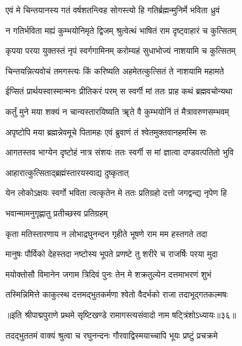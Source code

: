 \twolineshloka
{एवं मे चिन्तयानस्य गतं वर्षशतन्त्विह}
{सोगस्त्यो हि गतिर्ब्रह्मन्मुनिर्मे भविता ध्रुवं}%

\twolineshloka
{न गतिर्भविता मह्यं कुम्भयोनिमृते द्विजम्}
{श्रुत्वेत्थं भाषितं राम दृष्ट्वाहारं च कुत्सितम्}%

\twolineshloka
{कृपया परया युक्तस्तं नृपं स्वर्गगामिनम्}
{करोम्यहं सुधाभोज्यं नाशयामि च कुत्सितम्}%

\twolineshloka
{चिन्तयन्नित्यवोचं तमगस्त्यः किं करिष्यति}
{अहमेतत्कुत्सितं ते नाशयामि महामते}%

\twolineshloka
{ईप्सितं प्रार्थयस्वास्मान्मनः प्रीतिकरं परम्}
{स स्वर्गी मां ततः प्राह कथं ब्रह्मवचोन्यथा}%

\twolineshloka
{कर्तुं मुने मया शक्यं न चान्यस्तारयिष्यति}
{ॠते वै कुम्भयोनिं तं मैत्रावरुणसम्भवम्}%

\twolineshloka
{अपृष्टोपि मया ब्रह्मन्नेवमूचे पितामहः}
{एवं ब्रुवाणं तं श्वेतमुक्तवानहमस्मि सः}%

\twolineshloka
{आगतस्तव भाग्येन दृष्टोहं नात्र संशयः}
{ततः स्वर्गी स मां ज्ञात्वा दण्डवत्पतितो भुवि}%



\onelineshloka
{आहारात्कुत्सिताद्ब्रह्मंस्तारयस्वाद्य दुष्कृतात्}%

\twolineshloka
{येन लोकोऽक्षयः स्वर्गो भविता त्वत्कृतेन मे}
{ततः प्रतिग्रहो दत्तो जगद्वन्द्य नृपेण हि}%


\onelineshloka
{भवान्मामनुगृह्णातु प्रतीच्छस्व प्रतिग्रहम्}%

\twolineshloka
{कृता मतिस्तारणाय न लोभाद्रघुनन्दन}
{गृहीते भूषणे राम मम हस्तगते तदा}%

\twolineshloka
{मानुषः पौर्विको देहस्तदा नष्टोस्य भूपते}
{प्रणष्टे तु शरीरे च राजर्षिः परया मुदा}%

\twolineshloka
{मयोक्तोसौ विमानेन जगाम त्रिदिवं पुनः}
{तेन मे शक्रतुल्येन दत्तमाभरणं शुभं}%

\twolineshloka
{तस्मिन्निमित्ते काकुत्स्थ दत्तमद्भुतकर्मणा}
{श्वेतो वैदर्भको राजा तदाभूद्गतकल्मषः}%

{॥इति श्रीपाद्मपुराणे प्रथमे सृष्टिखण्डे रामागस्त्यसंवादो नाम षट्त्रिंशोऽध्यायः॥३६॥}



\twolineshloka
{तदद्भुततमं वाक्यं श्रुत्वा च रघुनन्दनः}
{गौरवाद्विस्मयाच्चापि भूयः प्रष्टुं प्रचक्रमे}%

